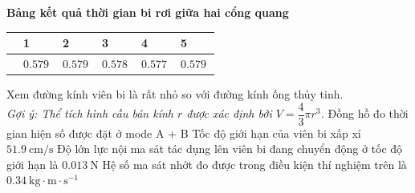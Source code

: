 \begin{ex}
	\begin{center}
		\textbf{Bảng kết quả thời gian bi rơi giữa hai cổng quang}\\
		\begin{tabular}{|M{4cm}|M{2cm}|M{2cm}|M{2cm}|M{2cm}|M{2cm}|}
			\hline
			 & 1& 2 & 3 & 4 & 5 \\
			\hline
			 & $\SI{0.579}{}$ & $\SI{0.579}{}$ & $\SI{0.578}{}$ & $\SI{0.577}{}$ & $\SI{0.579}{}$\\
			\hline
		\end{tabular}
	\end{center}
	Xem đường kính viên bi là rất nhỏ so với đường kính ống thủy tinh.\\
	\textit{Gợi ý: Thể tích hình cầu bán kính $r$ được xác định bởi $V=\dfrac{4}{3}\pi r^3$.}
	\choiceTF
	{Đồng hồ đo thời gian hiện số được đặt ở mode A + B}
	{\True Tốc độ giới hạn của viên bi xấp xỉ $\SI{51.9}{\centi\meter/\second}$}
	{Độ lớn lực nội ma sát tác dụng lên viên bi đang chuyển động ở tốc độ giới hạn là $\SI{0.013}{\newton}$}
	{\True Hệ số ma sát nhớt đo được trong điều kiện thí nghiệm trên là $\SI{0.34}{\kilogram\cdot\meter\cdot\second^{-1}}$}

	\loigiai{}
\end{ex}
